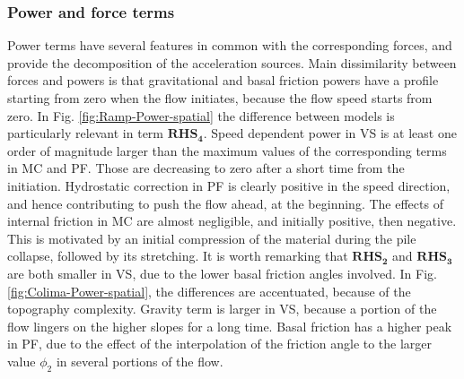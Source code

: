 \documentclass{article}
\begin{document}
\subsubsection{Power and force terms}
Power terms have several features in common with the corresponding forces, and provide the decomposition of the acceleration sources. Main dissimilarity between forces and powers is that gravitational and basal friction powers have a profile starting from zero when the flow initiates, because the flow speed starts from zero. In Fig. \ref{fig:Ramp-Power-spatial} the difference between models is particularly relevant in term  $\boldsymbol{RHS_4}$. Speed dependent power in VS is at least one order of magnitude larger than the maximum values of the corresponding terms in MC and PF. Those are decreasing to zero after a short time from the initiation. Hydrostatic correction in PF is clearly positive in the speed direction, and hence contributing to push the flow ahead, at the beginning. The effects of internal friction in MC are almost negligible, and initially positive, then negative. This is motivated by an initial compression of the material during the pile collapse, followed by its stretching. It is worth remarking that $\boldsymbol{RHS_2}$ and $\boldsymbol{RHS_3}$ are both smaller in VS, due to the lower basal friction angles involved. In Fig. \ref{fig:Colima-Power-spatial}, the differences are accentuated, because of the topography complexity. Gravity term is larger in VS, because a portion of the flow lingers on the higher slopes for a long time. Basal friction has a higher peak in PF, due to the effect of the interpolation of the friction angle to the larger value $\phi_2$ in several portions of the flow.
\end{document}
